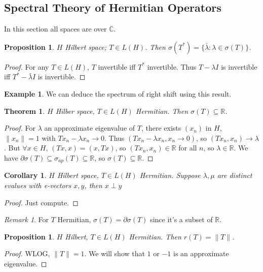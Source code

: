\documentclass{article}
\theoremstyle{definition}
\newtheorem{example}[defn]{Example}
\theoremstyle{remark}
\newtheorem{rem}{Remark}
\theoremstyle{plain}
\newtheorem{thm}[defn]{Theorem}
\newtheorem{prop}[defn]{Proposition}
\newtheorem{crly}[defn]{Corollary}
\newcommand{\RR}{\mathbb{R}}
\newcommand{\CC}{\mathbb{C}}
\begin{document}
\subsection{Spectral Theory of Hermitian Operators}
In this section all spaces are over $\CC$.
\begin{prop}
    $H$ Hilbert space; $T\in L(H)$. Then $\sigma(T^\ast)=\{\bar\lambda:\lambda\in\sigma(T)\}$.
\end{prop}
\begin{proof}
    For any $T\in L(H)$, $T$ invertible iff $T^\ast $ invertible. Thus $T-\lambda I$ is invertible iff $T^\ast-\bar\lambda I$ is invertible.
\end{proof}
\begin{example}
    We can deduce the spectrum of right shift using this result.
\end{example}
\begin{thm}
    $H$ Hilber space, $T\in L(H)$ Hermitian. Then $\sigma(T)\subseteq \RR$.
\end{thm}
\begin{proof}
    For $\lambda$ an approximate eigenvalue of $T$, there exists $(x_n)$ in $H$, $\|x_n\|=1$ with $Tx_n-\lambda x_n\to 0$. Thus $(Tx_n-\lambda x_n,x_n\to 0)$, so $(Tx_n,x_n)\to \lambda$. But $\forall x\in H$, $(Tx,x)=(x,Tx)$, so $(Tx_n,x_n)\in \RR$ for all $n$, so $\lambda\in \RR$. We have $\partial\sigma(T)\subseteq\sigma_{ap}(T)\subseteq \RR$, so $\sigma(T)\subseteq \RR$.
\end{proof}
\begin{crly}
    $H$ Hilbert space, $T\in L(H)$ Hermitian. Suppose $\lambda,\mu$ are distinct evalues with e-vectors $x,y$, then $x\perp y$
\end{crly}
\begin{proof}
    Just compute.
\end{proof}
\begin{rem}
    For $T$ Hermitian, $\sigma(T)=\partial\sigma(T)$ since it's a subset of $\RR$.
\end{rem}
\begin{prop}
    $H$ Hilbert, $T\in L(H)$ Hermitian. Then $r(T)=\|T\|$.
\end{prop}
\begin{proof}
    WLOG, $\|T\|=1$. We will show that $1$ or $-1$ is an approximate eigenvalue.
\end{proof}
\end{document}
